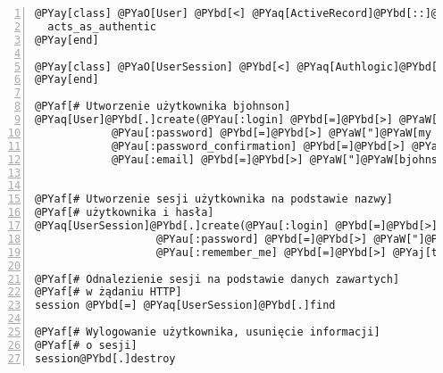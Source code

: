 \begin{Verbatim}[commandchars=@\[\],numbers=left,firstnumber=1,stepnumber=1]
@PYay[class] @PYaO[User] @PYbd[<] @PYaq[ActiveRecord]@PYbd[::]@PYaq[Base]
  acts_as_authentic
@PYay[end]

@PYay[class] @PYaO[UserSession] @PYbd[<] @PYaq[Authlogic]@PYbd[::]@PYaq[Session]@PYbd[::]@PYaq[Base]
@PYay[end]

@PYaf[# Utworzenie użytkownika bjohnson]
@PYaq[User]@PYbd[.]create(@PYau[:login] @PYbd[=]@PYbd[>] @PYaW["]@PYaW[bjohnson]@PYaW["],
            @PYau[:password] @PYbd[=]@PYbd[>] @PYaW["]@PYaW[my password]@PYaW["],
            @PYau[:password_confirmation] @PYbd[=]@PYbd[>] @PYaW["]@PYaW[my password]@PYaW["],
            @PYau[:email] @PYbd[=]@PYbd[>] @PYaW["]@PYaW[bjohnson@at[]example.com]@PYaW["])


@PYaf[# Utworzenie sesji użytkownika na podstawie nazwy]
@PYaf[# użytkownika i hasła]
@PYaq[UserSession]@PYbd[.]create(@PYau[:login] @PYbd[=]@PYbd[>] @PYaW["]@PYaW[bjohnson]@PYaW["],
                   @PYau[:password] @PYbd[=]@PYbd[>] @PYaW["]@PYaW[my password]@PYaW["],
                   @PYau[:remember_me] @PYbd[=]@PYbd[>] @PYaj[true])

@PYaf[# Odnalezienie sesji na podstawie danych zawartych]
@PYaf[# w żądaniu HTTP]
session @PYbd[=] @PYaq[UserSession]@PYbd[.]find

@PYaf[# Wylogowanie użytkownika, usunięcie informacji]
@PYaf[# o sesji]
session@PYbd[.]destroy
\end{Verbatim}
